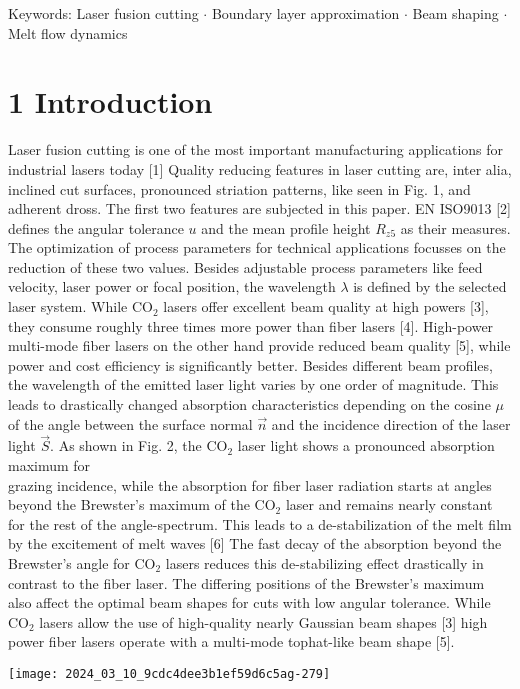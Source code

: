 \documentclass[10pt]{article}
\begin{document}
Keywords: Laser fusion cutting $\cdot$ Boundary layer approximation $\cdot$ Beam shaping $\cdot$ Melt flow dynamics

\section*{1 Introduction}
Laser fusion cutting is one of the most important manufacturing applications for industrial lasers today [1] Quality reducing features in laser cutting are, inter alia, inclined cut surfaces, pronounced striation patterns, like seen in Fig. 1, and adherent dross. The first two features are subjected in this paper. EN ISO9013 [2] defines the angular tolerance $u$ and the mean profile height $R_{z 5}$ as their measures. The optimization of process parameters for technical applications focusses on the reduction of these two values. Besides adjustable process parameters like feed velocity, laser power or focal position, the wavelength $\lambda$ is defined by the selected laser system. While $\mathrm{CO}_{2}$ lasers offer excellent beam quality at high powers [3], they consume roughly three times more power than fiber lasers [4]. High-power multi-mode fiber lasers on the other hand provide reduced beam quality [5], while power and cost efficiency is significantly better. Besides different beam profiles, the wavelength of the emitted laser light varies by one order of magnitude. This leads to drastically changed absorption characteristics depending on the cosine $\mu$ of the angle between the surface normal $\vec{n}$ and the incidence direction of the laser light $\vec{S}$. As shown in Fig. 2, the $\mathrm{CO}_{2}$ laser light shows a pronounced absorption maximum for\\
grazing incidence, while the absorption for fiber laser radiation starts at angles beyond the Brewster's maximum of the $\mathrm{CO}_{2}$ laser and remains nearly constant for the rest of the angle-spectrum. This leads to a de-stabilization of the melt film by the excitement of melt waves [6] The fast decay of the absorption beyond the Brewster's angle for $\mathrm{CO}_{2}$ lasers reduces this de-stabilizing effect drastically in contrast to the fiber laser. The differing positions of the Brewster's maximum also affect the optimal beam shapes for cuts with low angular tolerance. While $\mathrm{CO}_{2}$ lasers allow the use of high-quality nearly Gaussian beam shapes [3] high power fiber lasers operate with a multi-mode tophat-like beam shape [5].

\begin{center}
\texttt{[image: 2024\_03\_10\_9cdc4dee3b1ef59d6c5ag-279]}
\end{center}
\end{document}
